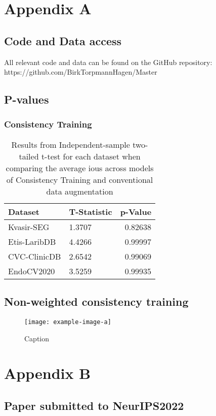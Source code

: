 \chapter*{Appendix A} \label{Appendix}
\setcounter{chapter}{7}

\setcounter{section}{0}
\section{Code and Data access}\label{code_data}
All relevant code and data can be found on the GitHub repository: https://github.com/BirkTorpmannHagen/Master
\section{P-values}\label{p_values}


\subsection{Consistency Training}
    \begin{table}[h]
        \centering
        \begin{tabularx}{0.75\linewidth}{lXr}
            \toprule
            Dataset & T-Statistic & p-Value \\
            \midrule
            Kvasir-SEG & 1.3707 & 0.82638\\
            Etis-LaribDB & 4.4266 & 0.99997\\
            CVC-ClinicDB & 2.6542 & 0.99069 \\
            EndoCV2020 & 3.5259 & 0.99935 \\
            \bottomrule
        \end{tabularx}
        \caption[T-test results consistency training]{Results from Independent-sample two-tailed t-test for each dataset when comparing the average \glspl{iou} across models of Consistency Training and conventional data augmentation}
        \label{tab:ttest_avgs}
    \end{table}

\section{Non-weighted consistency training}\label{non_weighted_ctraining}

\begin{figure}
    \centering
    \texttt{[image: example-image-a]}
    \caption{Caption}
    \label{fig:my_label}
\end{figure}

\chapter*{Appendix B} \label{Appendix}
\setcounter{chapter}{8}
\setcounter{section}{0}
\section{Paper submitted to NeurIPS2022}
\setcounter{chapter}{0}
\setcounter{section}{0}

